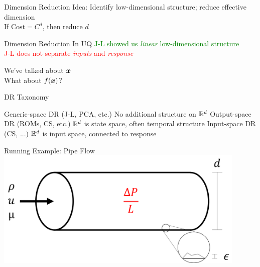 \documentclass[14pt]{beamer}
\begin{document}

\begin{frame}{Dimension Reduction}
  Idea: Identify low-dimensional structure; reduce effective dimension \\
  If $\text{Cost} = C^d$, then reduce $d$
\end{frame}

\begin{frame}{Dimension Reduction \alert{In UQ}}
  \bigskip \textcolor{green}{J-L showed us \emph{linear} low-dimensional structure} \\
  \textcolor{red}{J-L does not separate \emph{inputs} and \emph{response}}

  \bigskip We've talked about $\boldsymbol{x}$ \\
  What about $f(\boldsymbol{x})$?
\end{frame}

\begin{frame}{DR Taxonomy}
  \begin{outline}
  \1 Generic-space DR (J-L, PCA, etc.)
    \2 No additional structure on $\mathbb{R}^{d}$
  \1 Output-space DR (ROMs, CS, etc.)
    \2 $\mathbb{R}^{d}$ is state space, often temporal structure
  \1 \alert<2>{Input-space DR} (CS, ...)
    \2 $\mathbb{R}^{d}$ is input space, connected to response
  \end{outline}
\end{frame}

\begin{frame}{Running Example: Pipe Flow}
  \centering
  \includegraphics[width=0.9\textwidth]{../images/pipe_diagram}

\end{frame}
\end{document}
